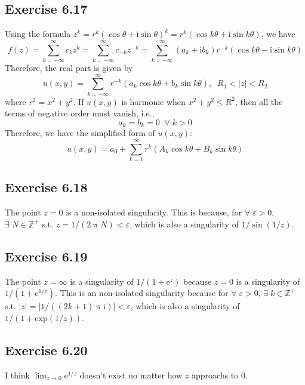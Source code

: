 \documentclass[]{ctexart}
\begin{document}
	\subsection{Exercise 6.17}
	Using the formula $z^k=r^k(\cos\theta+\mathrm{i}\sin\theta)^k=r^k(\cos k\theta+\mathrm{i}\sin k\theta)$, we have 
	\begin{equation*}
	f(z)=\sum_{k=-\infty}^\infty c_kz^k=\sum_{k=-\infty}^\infty c_{-k}z^{-k}=\sum_{k=-\infty}^\infty(a_k+\mathrm{i}b_k)r^{-k}(\cos k\theta-\mathrm{i}\sin k\theta)
	\end{equation*}
	Therefore, the real part is given by 
	\begin{equation*}
	u(x,y)=\sum_{k=-\infty}^{\infty}r^{-k}(a_k\cos k\theta+b_k\sin k\theta),\;\;R_1<|z|<R_2
	\end{equation*}
	where $r^2=x^2+y^2$. If $u(x,y)$ is harmonic when $x^2+y^2\le R^2$, then all the terms of negative order must vanish, i.e., 
	\begin{equation*}
	a_k=b_k=0\;\;\forall\;k>0
	\end{equation*}
	Therefore, we have the simplified form of $u(x,y)$: 
	\begin{equation*}
	u(x,y)=a_0+\sum_{k=1}^\infty r^k\left(A_k\cos k\theta+B_k\sin k\theta\right)
	\end{equation*}
	\subsection{Exercise 6.18}
	The point $z=0$ is a non-isolated singularity. This is because, for $\forall\;\varepsilon>0$, $\exists\;N\in\mathbb Z^+$ s.t. $z=1/(2\uppi N)<\varepsilon$, which is also 
	a singularity of $1/\sin(1/z)$. 
	\subsection{Exercise 6.19}
	The point $z=\infty$ is a singularity of $1/(1+\mathrm{e}^{z})$ because $z=0$ is a singularity of $1/(1+\mathrm{e}^{1/z})$. This is an non-isolated singularity because 
	for $\forall\;\varepsilon>0$, $\exists\;k\in\mathbb Z^+$ s.t. $|z|=|1/((2k+1)\uppi\mathrm{i})|<\varepsilon$, which is also a singularity of $1/(1+\mathrm{exp}(1/z))$. 
	\subsection{Exercise 6.20}
	I think $\lim_{z\to 0}\mathrm{e}^{1/z}$ doesn't exist no matter how $z$ approachs to 0. 
\end{document}
